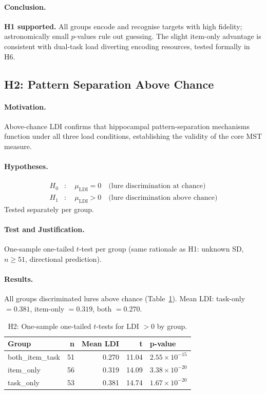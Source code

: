 \documentclass[10pt,a4paper]{article}
\begin{document}
\paragraph{Conclusion.}
\textbf{H1 supported.} All groups encode and recognise targets with high fidelity; astronomically small $p$-values rule out guessing. The slight item-only advantage is consistent with dual-task load diverting encoding resources, tested formally in H6.

\subsection*{H2: Pattern Separation Above Chance}

\paragraph{Motivation.}
Above-chance LDI confirms that hippocampal pattern-separation mechanisms function under all three load conditions, establishing the validity of the core MST measure.

\paragraph{Hypotheses.}
\begin{align*}
  H_0 &:\quad \mu_{\mathrm{LDI}} = 0 \quad \text{(lure discrimination at chance)} \\
  H_1 &:\quad \mu_{\mathrm{LDI}} > 0 \quad \text{(lure discrimination above chance)}
\end{align*}
Tested separately per group.

\paragraph{Test and Justification.}
One-sample one-tailed $t$-test per group (same rationale as H1: unknown SD, $n \geq 51$, directional prediction).

\paragraph{Results.}
All groups discriminated lures above chance (Table~\ref{tab:h2}). Mean LDI: task-only $= 0.381$, item-only $= 0.319$, both $= 0.270$.

\begin{table}[H]
\centering
\caption{H2: One-sample one-tailed $t$-tests for LDI $> 0$ by group.}
\label{tab:h2}
\begin{tabular}{lrrrl}
\toprule
\textbf{Group} & \textbf{n} & \textbf{Mean LDI} & \textbf{t} & \textbf{p-value} \\
\midrule
both\_item\_task & 51 & 0.270 & 11.04 & $2.55\times10^{-15}$ \\
item\_only       & 56 & 0.319 & 14.09 & $3.38\times10^{-20}$ \\
task\_only       & 53 & 0.381 & 14.74 & $1.67\times10^{-20}$ \\
\bottomrule
\end{tabular}
\end{table}
\end{document}
